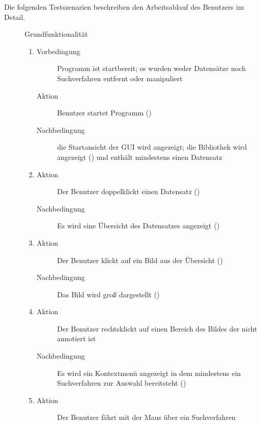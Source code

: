 Die folgenden Testszenarien beschreiben den Arbeitsablauf des Benutzers im Detail.	

\begin{description} %
	\item[] Grundfunktionalität %
	\begin{enumerate}
		\item
		\begin{description}
			\item[Vorbedingung] Programm ist startbereit; es wurden weder Datensätze noch Suchverfahren entfernt oder manipuliert
			\item[Aktion] Benutzer startet Programm ()
			\item[Nachbedingung] die Startansicht der GUI wird angezeigt; die Bibliothek wird angezeigt () und enthält mindestens einen Datensatz
		\end{description}
		\item
		\begin{description}
			\item[Aktion] Der Benutzer doppelklickt einen Datensatz ()
			\item[Nachbedingung] Es wird eine Übersicht des Datensatzes angezeigt ()
		\end{description}
		\item
		\begin{description}
			\item[Aktion] Der Benutzer klickt auf ein Bild aus der Übersicht ()
			\item[Nachbedingung] Das Bild wird groß dargestellt ()
		\end{description}
		\item
		\begin{description}
			\item[Aktion] Der Benutzer rechtsklickt auf einen Bereich des Bildes der nicht annotiert ist
			\item[Nachbedingung] Es wird ein Kontextmenü angezeigt in dem mindestens ein Suchverfahren zur Auswahl bereitsteht ()
		\end{description}
		\item
		\begin{description}
			\item[Aktion] Der Benutzer fährt mit der Maus über ein Suchverfahren

\end{description}
\end{enumerate}
\end{description}
